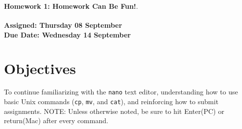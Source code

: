 \documentclass[letter,11pt]{article}
\begin{document}
\huge
\textbf{Homework 1: Homework Can Be Fun!}.
\normalsize
\\ ~~ \\
\textbf{Assigned: Thursday 08 September} \\
\textbf{Due Date: Wednesday 14 September}

\section*{Objectives}
\paragraph{}To continue familiarizing with the \texttt{nano} text editor, understanding how to use basic Unix commands (\texttt{cp}, \texttt{mv}, and \texttt{cat}), and reinforcing how to submit assignments. NOTE: Unless otherwise noted, be sure to hit Enter(PC) or return(Mac) after every command.
\end{document}
